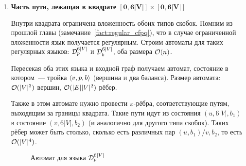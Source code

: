 \begin{enumerate}
    \item {\bf Часть пути, лежащая в квадрате $\mathbf{[0, 6|V|] \times [0, 6|V|]}$}

    Внутри квадрата ограничена вложенность обоих типов скобок. Помним из прошлой главы (замечание~\ref{fact:regular_cfpq}), что в случае ограниченной вложенности язык получается регулярным. Строим автоматы для таких регулярных языков: $\mathcal{D}_p^{6|V|}$ и $\mathcal{D}_b^{6|V|}$, оба размера $\mathcal{O}(n)$.

    Пересекая оба этих языка и входной граф получаем автомат, состояние в котором~--- тройка $\langle v, p, b \rangle$ (вершина и два баланса). Размер автомата: $\mathcal{O}(|V|^3)$ вершин, $\mathcal{O}(|E||V|^2)$ рёбер.

    Также в этом автомате нужно провести $\varepsilon$-рёбра, соответствующие путям, выходящим за границы квадрата. Такие пути идут из состояния $(u, 6|V|, b_1)$ в состояние $(v, 6|V|, b_2)$ (и аналогично для другого типа скобок). Таких рёбер может быть столько, сколько есть различных пар $(u, b_1)$/$v, b_2$, то есть $\mathcal{O}(|V|^4)$.

    \begin{figure}[h]
      \caption{Автомат для языка $\mathcal{D}_p^{6|V|}$}
      \label{img:dyck_6n_dfa}
    \end{figure}


\end{enumerate}
